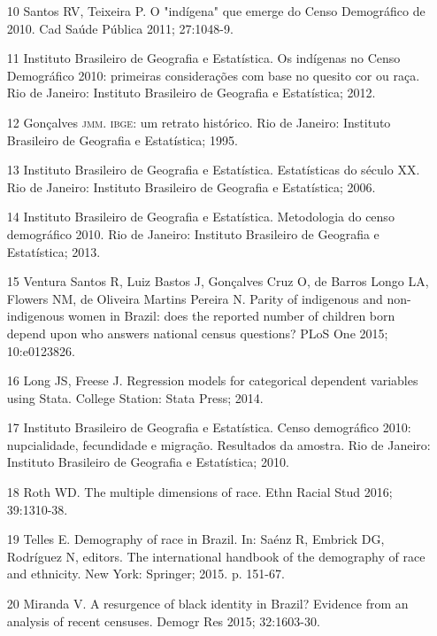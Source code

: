 \documentclass{article}
\begin{document}
\begin{itemize}
\item[10] Santos RV, Teixeira P. O "indígena" que emerge do Censo
Demográfico de 2010. Cad Saúde Pública 2011; 27:1048-9.

\item[11] Instituto Brasileiro de Geografia e Estatística. Os indígenas no
Censo Demográfico 2010: primeiras considerações com base no quesito cor ou raça.
Rio de Janeiro: Instituto Brasileiro de Geografia e Estatística; 2012.

\item[12] Gonçalves \textsc{jmm}. \textsc{ibge}: um retrato histórico. Rio de Janeiro:
Instituto Brasileiro de Geografia e Estatística; 1995.

\item[13] Instituto Brasileiro de Geografia e Estatística. Estatísticas do
século XX. Rio de Janeiro: Instituto Brasileiro de Geografia e Estatística;
2006.

\item[14] Instituto Brasileiro de Geografia e Estatística. Metodologia do
censo demográfico 2010. Rio de Janeiro: Instituto Brasileiro de Geografia e
Estatística; 2013.

\item[15] Ventura Santos R, Luiz Bastos J, Gonçalves Cruz O, de Barros Longo
LA, Flowers NM, de Oliveira Martins Pereira N. Parity of indigenous and
non-indigenous women in Brazil: does the reported number of children born depend
upon who answers national census questions? PLoS One 2015; 10:e0123826.

\item[16] Long JS, Freese J. Regression models for categorical dependent
variables using Stata. College Station: Stata Press; 2014.

\item[17] Instituto Brasileiro de Geografia e Estatística. Censo demográfico
2010: nupcialidade, fecundidade e migração. Resultados da amostra. Rio de
Janeiro: Instituto Brasileiro de Geografia e Estatística; 2010.

\item[18] Roth WD. The multiple dimensions of race. Ethn Racial Stud 2016;
39:1310-38.

\item[19] Telles E. Demography of race in Brazil. In: Saénz R, Embrick DG,
Rodríguez N, editors. The international handbook of the demography of race and
ethnicity. New York: Springer; 2015. p. 151-67.

\item[20] Miranda V. A resurgence of black identity in Brazil? Evidence from
an analysis of recent censuses. Demogr Res 2015; 32:1603-30.


\end{itemize}
\end{document}
